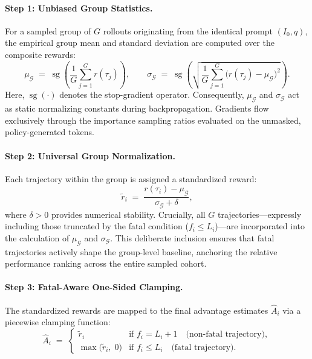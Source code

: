 \paragraph{Step 1: Unbiased Group Statistics.}
For a sampled group of $G$ rollouts originating from the identical prompt $(I_0, q)$, the empirical group mean and standard deviation are computed over the composite rewards:
\begin{equation}
  \mu_{\mathcal{G}} \;=\; \operatorname{sg}\!\left( \frac{1}{G}\sum_{j=1}^{G} r(\tau_j) \right), \qquad
  \sigma_{\mathcal{G}} \;=\; \operatorname{sg}\!\left( \sqrt{ \frac{1}{G}\sum_{j=1}^{G} \bigl(r(\tau_j) - \mu_{\mathcal{G}}\bigr)^{2} } \right).
\end{equation}
Here, $\operatorname{sg}(\cdot)$ denotes the stop-gradient operator. Consequently, $\mu_{\mathcal{G}}$ and $\sigma_{\mathcal{G}}$ act as static normalizing constants during backpropagation. Gradients flow exclusively through the importance sampling ratios evaluated on the unmasked, policy-generated tokens.

\paragraph{Step 2: Universal Group Normalization.}
Each trajectory within the group is assigned a standardized reward:
\begin{equation}
  \widetilde{r}_i \;=\; \frac{r(\tau_i) - \mu_{\mathcal{G}}}{\sigma_{\mathcal{G}} + \delta},
\end{equation}
where $\delta > 0$ provides numerical stability. Crucially, all $G$ trajectories---expressly including those truncated by the fatal condition ($f_i \le L_i$)---are incorporated into the calculation of $\mu_{\mathcal{G}}$ and $\sigma_{\mathcal{G}}$. This deliberate inclusion ensures that fatal trajectories actively shape the group-level baseline, anchoring the relative performance ranking across the entire sampled cohort.

\paragraph{Step 3: Fatal-Aware One-Sided Clamping.}
The standardized rewards are mapped to the final advantage estimates $\hat{A}_i$ via a piecewise clamping function:
\begin{equation}
  \hat{A}_i \;=\;
  \begin{cases}
    \widetilde{r}_i & \text{if } f_i = L_i{+}1 \quad\text{(non-fatal trajectory)},\\[4pt]
    \max\!\bigl(\widetilde{r}_i,\; 0\bigr) & \text{if } f_i \le L_i \quad\text{(fatal trajectory)}.
  \end{cases}
\end{equation}


